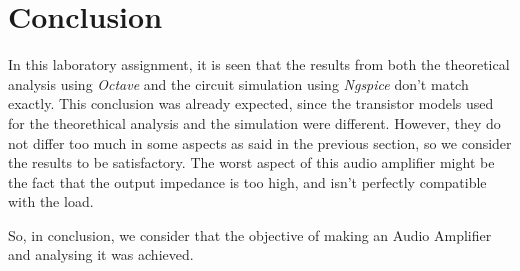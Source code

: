 \section{Conclusion}
\label{sec:conclusion}

In this laboratory assignment, it is seen that the results from both the theoretical analysis using \textit{Octave} and the circuit simulation using \textit{Ngspice} don't match exactly. This conclusion was already expected, since the transistor models used for the theorethical analysis and the simulation were different. However, they do not differ too much in some aspects as said in the previous section, so we consider the results to be satisfactory. The worst aspect of this audio amplifier might be the fact that the output impedance is too high, and isn't perfectly compatible with the load. 
\par
So, in conclusion, we consider that the objective of making an Audio Amplifier and analysing it was achieved. 
